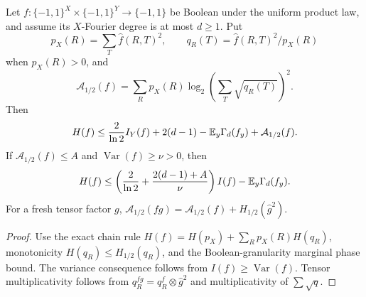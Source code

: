 \begin{theorem}
Let $f:\{-1,1\}^X\times\{-1,1\}^Y\to\{-1,1\}$ be Boolean under the uniform product law, and assume its $X$-Fourier degree is at most $d\ge1$. Put
\[
p_X(R)=\sum_T\widehat f(R,T)^2,\qquad
q_R(T)=\widehat f(R,T)^2/p_X(R)
\]
when $p_X(R)>0$, and
\[
\mathcal A_{1/2}(f)=\sum_Rp_X(R)\log_2\left(\sum_T\sqrt{q_R(T)}\right)^2.
\]
Then
\[
H(f)\le {2\over\ln2}I_Y(f)+2(d-1)-\mathbb E_y\Gamma_d(f_y)+\mathcal A_{1/2}(f).
\]
If $\mathcal A_{1/2}(f)\le A$ and $\operatorname{Var}(f)\ge\nu>0$, then
\[
H(f)\le\left({2\over\ln2}+{2(d-1)+A\over\nu}\right)I(f)-\mathbb E_y\Gamma_d(f_y).
\]
For a fresh tensor factor $g$, $\mathcal A_{1/2}(fg)=\mathcal A_{1/2}(f)+H_{1/2}(\widehat g^2)$.
\end{theorem}

\begin{proof}
Use the exact chain rule $H(f)=H(p_X)+\sum_Rp_X(R)H(q_R)$, monotonicity $H(q_R)\le H_{1/2}(q_R)$, and the Boolean-granularity marginal phase bound. The variance consequence follows from $I(f)\ge\operatorname{Var}(f)$. Tensor multiplicativity follows from $q_R^{fg}=q_R^f\otimes\widehat g^2$ and multiplicativity of $\sum\sqrt q$.
\end{proof}

